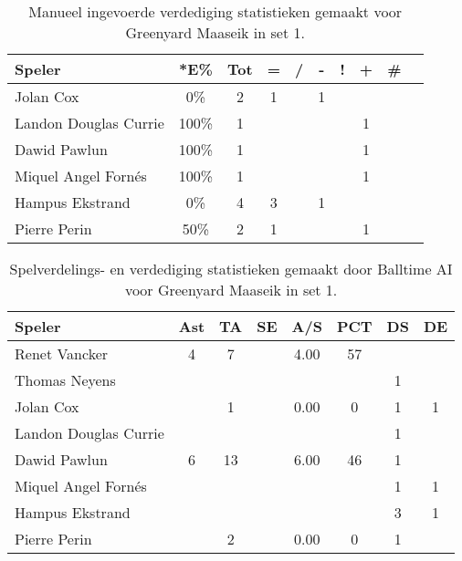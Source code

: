 \begin{table}[ht!]
    \centering
    \scriptsize
    \begin{tabular}{|l|c|c|c|c|c|c|c|c|c|} \hline
        \textbf{Speler}  & *E\% & Tot & = & / & - & ! & + & \# \\ \hline
        Jolan Cox & 0\% & 2 & 1 &  & 1 &  &  &  \\ 
        Landon Douglas Currie & 100\% & 1 &  &  &  &  & 1 &  \\ 
        Dawid Pawlun & 100\% & 1 &  &  &  &  & 1 &  \\ 
        Miquel Angel Fornés & 100\% & 1 &  &  &  &  & 1 &  \\ 
        Hampus Ekstrand & 0\% & 4 & 3 &  & 1 &  &  &  \\ 
        Pierre Perin & 50\% & 2 & 1 &  &  &  & 1 &  \\ \hline
    \end{tabular}
    \caption[Manueel ingevoerde verdedigingsstatistieken gemaakt voor Greenyard Maaseik in set 1]{\label{tab:PL1DigMaaseikMan1}Manueel ingevoerde verdediging statistieken gemaakt voor Greenyard Maaseik in set 1.}
\end{table}

\begin{table}[ht!]
  \centering
  \scriptsize
  \begin{tabular}{|l|c|c|c|c|c|c|c|}  \hline
    \textbf{Speler} & Ast & TA & SE & A/S & PCT & DS & DE \\ \hline
    Renet Vancker & 4 & 7 &  & 4.00 & 57 &  &  \\
    Thomas Neyens &  &  &  &  &  & 1 &  \\
    Jolan Cox &  & 1 &  & 0.00 & 0 & 1 & 1 \\
    Landon Douglas Currie &  &  &  &  &  & 1 &  \\
    Dawid Pawlun & 6 & 13 &  & 6.00 & 46 & 1 &  \\
    Miquel Angel Fornés &  &  &  &  &  & 1 & 1 \\
    Hampus Ekstrand &  &  &  &  &  & 3 & 1 \\
    Pierre Perin &  & 2 &  & 0.00 & 0 & 1 &  \\ \hline
  \end{tabular}
  \caption[Spelverdelings- en verdedigingsstatistieken gemaakt door Balltime AI voor Greenyard Maaseik in set 1]{\label{tab:PL1SetDigMaaseikAI1}Spelverdelings- en verdediging statistieken gemaakt door Balltime AI voor Greenyard Maaseik in set 1.}
\end{table}


